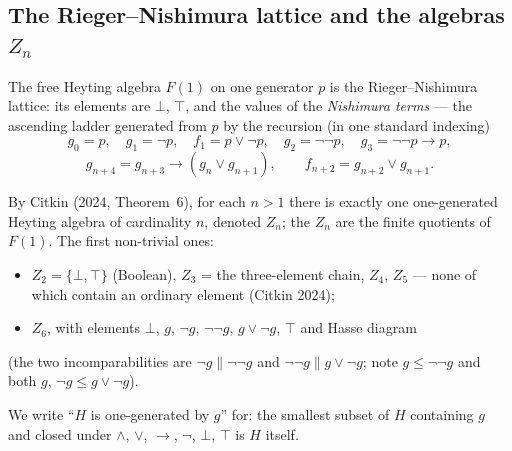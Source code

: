 ﻿\documentclass[11pt]{amsart}
\theoremstyle{plain}
\theoremstyle{definition}
\theoremstyle{remark}
\newcommand{\Znn}[1]{Z_{#1}}
\newcommand{\himp}{\to}          %
\begin{document}
\subsection{The Rieger--Nishimura lattice and the algebras $\Znn{n}$}

The free Heyting algebra $F(1)$ on one generator $p$ is the Rieger--Nishimura
lattice: its elements are $\bot$, $\top$, and the values of the
\emph{Nishimura terms} --- the ascending ladder generated from $p$ by the
recursion (in one standard indexing)
\[
g_0 = p, \quad g_1 = \neg p, \quad f_1 = p \vee \neg p, \quad
g_2 = \neg\neg p, \quad g_3 = \neg\neg p \himp p,
\]
\[
g_{n+4} = g_{n+3} \himp (g_n \vee g_{n+1}), \qquad
f_{n+2} = g_{n+2} \vee g_{n+1}.
\]

By Citkin (2024, Theorem~6), for each $n > 1$ there is exactly one
one-generated Heyting algebra of cardinality $n$, denoted $\Znn{n}$; the
$\Znn{n}$ are the finite quotients of $F(1)$. The first non-trivial ones:
\begin{itemize}
\item $\Znn{2} = \{\bot, \top\}$ (Boolean), $\Znn{3}$ = the three-element
chain, $\Znn{4}$, $\Znn{5}$ --- none of which contain an ordinary element
(Citkin 2024);
\item $\Znn{6}$, with elements $\bot$, $g$, $\neg g$, $\neg\neg g$,
$g \vee \neg g$, $\top$ and Hasse diagram
\end{itemize}

\begin{center}
\end{center}

\noindent (the two incomparabilities are $\neg g \parallel \neg\neg g$ and
$\neg\neg g \parallel g \vee \neg g$; note $g \le \neg\neg g$ and both $g$,
$\neg g \le g \vee \neg g$).

We write ``$H$ is one-generated by $g$'' for: the smallest subset of $H$
containing $g$ and closed under $\wedge$, $\vee$, $\himp$, $\neg$, $\bot$,
$\top$ is $H$ itself.
\end{document}

